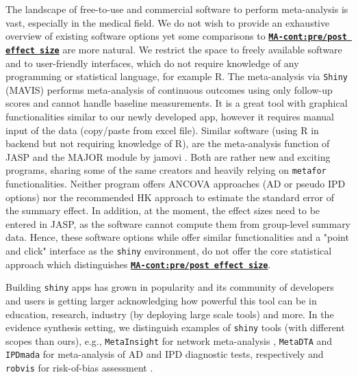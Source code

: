 \documentclass[AMA,STIX1COL]{WileyNJD-v2}
\begin{document}
The landscape of free-to-use and commercial software to perform meta-analysis is vast, especially in the medical field. We do not wish to provide an exhaustive overview of existing software options yet some comparisons to \href{https://katerina-pap.shinyapps.io/MA-cont-prepostES/}{\textbf{\texttt{MA-cont:pre/post effect size}}} are more natural. We restrict the space to freely available software and to user-friendly interfaces, which do not require knowledge of any programming or statistical language, for example R. The meta-analysis via \texttt{Shiny} (MAVIS) \citep{hamilton2014meta} performs meta-analysis of continuous outcomes using only follow-up scores and cannot handle baseline measurements. It is a great tool with graphical functionalities similar to our newly developed app, however it requires manual input of the data (copy/paste from excel file). %
Similar software (using R in backend but not requiring knowledge of R), are the meta-analysis function of JASP \citep{JASP2020} and the MAJOR module by jamovi \citep{jamovi2021}. Both are rather new and exciting programs, sharing some of the same creators and heavily relying on \texttt{metafor} functionalities. Neither program offers ANCOVA approaches (AD or pseudo IPD options) nor the recommended HK approach to estimate the standard error of the summary effect. In addition, at the moment, the effect sizes need to be entered in JASP, as the software cannot compute them from group-level summary data. Hence, these software options while offer similar functionalities and a "point and click" interface as the \texttt{shiny} environment, do not offer the core statistical approach which distinguishes \href{https://katerina-pap.shinyapps.io/MA-cont-prepostES/}{\textbf{\texttt{MA-cont:pre/post effect size}}}.

Building \texttt{shiny} apps has grown in popularity and its community of developers and users is getting larger acknowledging how powerful this tool can be in education, research, industry (by deploying large scale tools) and more. In the evidence synthesis setting, we distinguish examples of \texttt{shiny} tools (with different scopes than ours), e.g., \texttt{MetaInsight} for network meta-analysis \citep{owen2019metainsight}, \texttt{MetaDTA} \citep{freeman2019development} and \texttt{IPDmada} \citep{wang2021ipdmada} for meta-analysis of AD and IPD diagnostic tests, respectively and \texttt{robvis} for risk-of-bias assessment \citep{mcguinness2021risk}.
\end{document}

